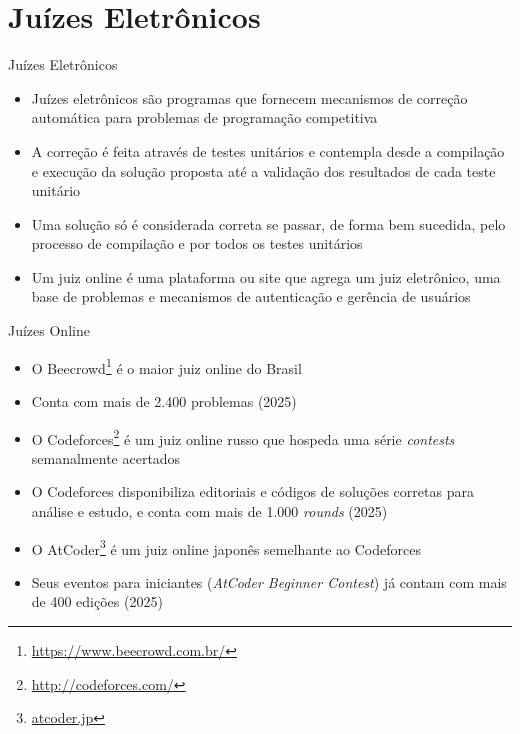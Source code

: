 \section{Juízes Eletrônicos}

\begin{frame}[fragile]{Juízes Eletrônicos}

    \begin{itemize}
        \item Juízes eletrônicos são programas que fornecem mecanismos de correção automática para
        problemas de programação competitiva
        \item A correção é feita através de testes unitários e contempla desde a compilação e
        execução da solução proposta até a validação dos resultados de cada teste unitário
        \item Uma solução só é considerada correta se passar, de  forma  bem  sucedida,
        pelo  processo de  compilação  e por todos os testes unitários
        \item Um juiz online é uma plataforma ou site que agrega um juiz eletrônico, uma base de
        problemas e mecanismos de autenticação e gerência de usuários
    \end{itemize}

\end{frame}

\begin{frame}[fragile]{Juízes Online}

    \begin{itemize}
        \item O Beecrowd\footnote{\url{https://www.beecrowd.com.br/}}
        é o maior juiz online do Brasil

        \item Conta com mais de 2.400 problemas (2025)
        \item O Codeforces\footnote{\url{http://codeforces.com/}} é um juiz online russo que
        hospeda uma série \textit{contests} semanalmente
        acertados
        \item O Codeforces disponibiliza editoriais e códigos de soluções corretas para análise e
        estudo, e conta com mais de 1.000 \textit{rounds} (2025)
    \item O AtCoder\footnote{\url{atcoder.jp}} é um juiz online japonês semelhante ao Codeforces
    \item Seus eventos para iniciantes (\textit{AtCoder Beginner Contest}) já contam com mais de 400
        edições (2025)
   \end{itemize}

\end{frame}

